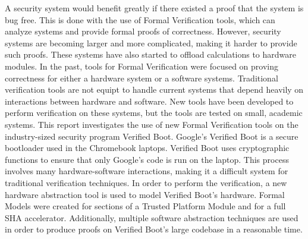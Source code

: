 A security system would benefit greatly if there existed a proof that the system is bug free. 
This is done with the use of Formal Verification tools, which can analyze systems and provide formal proofs of correctness.
However, security systems are becoming larger and more complicated, making it harder to provide such proofs. 
These systems have also started to offload calculations to hardware modules.
In the past, tools for Formal Verification were focused on proving correctness for either a hardware system or a software systems.
Traditional verification tools are not equipt to handle current systems that depend heavily on interactions between hardware and software.
New tools have been developed to perform verification on these systems, but the tools are tested on small, academic systems.
This report investigates the use of new Formal Verification tools on the industry-sized security program Verified Boot.
Google's Verified Boot is a secure bootloader used in the Chromebook laptops.
Verified Boot uses cryptographic functions to ensure that only Google's code is run on the laptop.
This process involves many hardware-software interactions, making it a difficult system for traditional verification techniques.
In order to perform the verification, a new hardware abstraction tool is used to model Verified Boot's hardware.
Formal Models were created for sections of a Trusted Platform Module and for a full SHA accelerator.
Additionally, multiple software abstraction techniques are used in order to produce proofs on Verified Boot's large codebase in a reasonable time.
